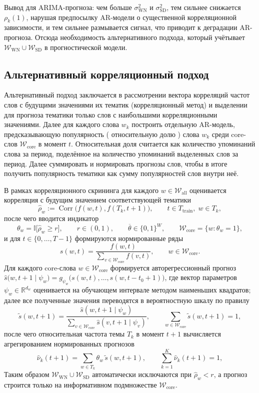 \documentclass[14pt,a4paper]{article}
\begin{document}
Вывод для ARIMA-прогноза: чем больше $\sigma_{\mathrm{WN}}^{2}$ и $\sigma_{\mathrm{SD}}^{2}$, тем сильнее
снижается $\rho_{k}(1)$, нарушая предпосылку AR-модели о существенной
корреляционной зависимости, и тем сильнее размывается сигнал, что приводит к деградации AR-прогноза.
Отсюда необходимость альтернативного подхода, который учётывает $\mathcal{W}_{\mathrm{WN}}\cup\mathcal{W}_{\mathrm{SD}}$ в прогностической модели.


\newpage
\subsection{Альтернативный корреляционный подход}
\label{ssec:alt}
Альтернативный подход заключается в рассмотрении вектора корреляций частот слов с будущими значениями их тематик (корреляционный метод) и выделении для прогноза тематики только слов с наибольшими корреляционными значениями.
Далее для каждого слова $w_k$ построить отдельную AR-модель, предсказывающую популярность ( относительную долю ) слова $w_k$ среди core-слов $\mathcal{W}_{\mathrm{core}}$ в момент $t$.
Относительная доля считается как количество упоминаний слова за период, поделённое на количество упоминаний выделенных слов за период.
Далее суммировать и нормировать прогнозы слов, чтобы в итоге получить популярность тематики как сумму популярностей слов внутри неё.

В рамках корреляционного скрининга для каждого $w\in\mathcal{W}_{\mathrm{all}}$ оценивается корреляция с будущим значением соответствующей тематики 
\[
\widehat\rho_{w}:=\operatorname{Corr}\bigl(f(w,t),f(T_{k},t+1)\bigr),\qquad t\in T_{\mathrm{train}},\;w\in T_{k},
\]
после чего вводится индикатор 
\[
\theta_{w}=\mathbb{I}\bigl[\widehat\rho_{w}\ge r\bigr],\qquad r\in(0,1),\qquad\overline{\theta}\in\{0,1\}^{W},\qquad 
\mathcal{W}_{\mathrm{core}}=\{w:\theta_{w}=1\},
\]
и для $t\in\{0,\dots,T-1\}$ формируются нормированные ряды
\[
s(w,t)=\frac{f(w,t)}{\displaystyle\sum_{v\in\mathcal{W}_{\mathrm{core}}}f(v,t)},\qquad w\in\mathcal{W}_{\mathrm{core}}.
\]
Для каждого core-слова $w\in\mathcal{W}_{\mathrm{core}}$ формируется авторегрессионный прогноз $\widehat{s}\!\bigl(w,t+1\mid\psi_{w}\bigr)=g_{\psi_{w}}\bigl(s(w,t),\dots,s(w,t-t_{0}+1)\bigr)$, где вектор параметров $\psi_{w}\in\mathbb{R}^{d_{w}}$ оценивается на обучающем интервале методом наименьших квадратов; далее все полученные значения переводятся в вероятностную шкалу по правилу
\[
\widetilde{s}(w,t+1)=\frac{\widehat{s}(w,t+1\mid\psi_{w})}{\sum_{v\in\mathcal{W}_{\mathrm{core}}}\widehat{s}(v,t+1\mid\psi_{v})},\qquad \sum_{w\in\mathcal{W}_{\mathrm{core}}}\widetilde{s}(w,t+1)=1,
\]
после чего относительная частота темы $T_{k}$ в момент $t+1$ вычисляется агрегированием нормированных прогнозов
\[
\widehat{\nu}_{k}(t+1)=\sum_{w\in T_{k}}\theta_{w}\,\widetilde{s}(w,t+1),\qquad\sum_{k=1}^{K}\widehat{\nu}_{k}(t+1)=1,
\]
Таким образом $\mathcal{W}_{\mathrm{WN}}\cup\mathcal{W}_{\mathrm{SD}}$  
автоматически исключаются при $\widehat\rho_{w}<r$,  
а прогноз строится только на информативном подмножестве
$\mathcal{W}_{\mathrm{core}}$.
\end{document}
